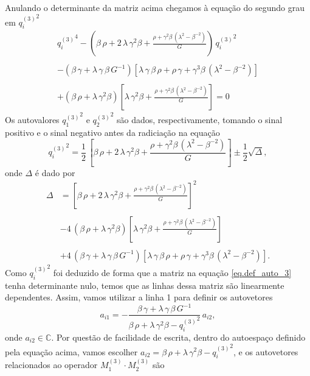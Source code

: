 Anulando o determinante da matriz acima chegamos \`a equa\c{c}\~ao do segundo grau em ${q^{(3)}_i}^2$
\begin{equation*}
\begin{split}
{q^{(3)}_i}^4-\left(\beta\,\rho+2\,\lambda\,\gamma^2\beta+\frac{\rho+\gamma^2\beta\,(\lambda^2-\beta^{-2})}{G}\right)\,{q^{(3)}_i}^2\\\\
-\left(\beta\,\gamma+\lambda\,\gamma\,\beta\,G^{-1}\right)\left[\lambda\,\gamma\,\beta\,\rho+\rho\,\gamma+\gamma^3\beta\,(\lambda^2-\beta^{-2})\right]\\\\
+(\beta\,\rho+\lambda\,\gamma^2\beta)\left[\lambda\,\gamma^2\beta+\frac{\rho+\gamma^2\beta\,(\lambda^2-\beta^{-2})}{G}\right]=0
\end{split}
\end{equation*}
Os autovalores ${q^{(3)}_1}^2$ e ${q^{(3)}_2}^2$ s\~ao dados, respectivamente, tomando o sinal positivo e o sinal negativo antes da radicia\c{c}\~ao na equa\c{c}\~ao
\begin{equation*}
{q^{(3)}_i}^2=\frac{1}{2}\,\left[\beta\,\rho+2\,\lambda\,\gamma^2\beta+\frac{\rho+\gamma^2\beta\,(\lambda^2-\beta^{-2})}{G}\right]\pm\frac{1}{2}\sqrt{\Delta},
\end{equation*}
onde $\Delta$ \'e dado por
\begin{align*}
\Delta&=
\left[\beta\,\rho+2\,\lambda\,\gamma^2\beta+\frac{\rho+\gamma^2\beta\,(\lambda^2-\beta^{-2})}{G}\right]^2\\\\
&-4\,(\beta\,\rho+\lambda\,\gamma^2\beta)\left[\lambda\,\gamma^2\beta+\frac{\rho+\gamma^2\beta\,(\lambda^2-\beta^{-2})}{G}\right]\\\\
&+4\,\left(\beta\,\gamma+\lambda\,\gamma\,\beta\,G^{-1}\right)\left[\lambda\,\gamma\,\beta\,\rho+\rho\,\gamma+\gamma^3\beta\,(\lambda^2-\beta^{-2})\right].
\end{align*}
Como ${q^{(3)}_i}^2$ foi deduzido de forma que a matriz na equa\c{c}\~ao \ref{eq.def_auto_3} tenha determinante nulo, temos que as linhas dessa matriz s\~ao linearmente dependentes. Assim, vamos utilizar a linha 1 para definir os autovetores
\begin{equation*}
a_{i1}=-\frac{\beta\,\gamma+\lambda\,\gamma\,\beta\,G^{-1}}{\beta\,\rho+\lambda\,\gamma^2\beta-{q^{(3)}_i}^2}\,a_{i2},
\end{equation*}
onde $a_{i2}\in \mathbb{C}$. Por quest\~ao de facilidade de escrita, dentro do autoespa\c{c}o definido pela equa\c{c}\~ao acima, vamos escolher $a_{i2}=\beta\,\rho+\lambda\,\gamma^2\beta-{q^{(3)}_i}^2$, e os autovetores relacionados ao operador $M^{(3)}_1\cdot M^{(3)}_2$ s\~ao
